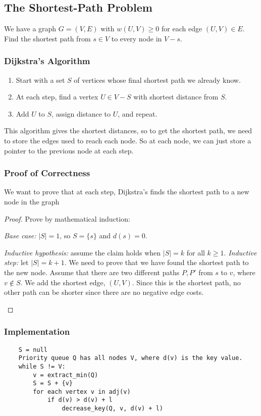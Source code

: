 \documentclass[11pt]{article}
\begin{document}
\subsection{The Shortest-Path Problem}
We have a graph $G = (V,E)$ with $w(U,V) \geq 0$ for each edge $(U,V) \in E$. Find the shortest path from $s \in V$ to every node in $V-s$.
\subsubsection{Dijkstra's Algorithm}
\begin{enumerate}
    \item Start with a set $S$ of vertices whose final shortest path we already know.
    \item At each step, find a vertex $U \in V-S$ with shortest distance from $S$.
    \item Add $U$ to $S$, assign distance to $U$, and repeat.
\end{enumerate}
This algorithm gives the shortest distances, so to get the shortest path, we need to store the edges used to reach each node. So at each node, we can just store a pointer to the previous node at each step.

\subsubsection{Proof of Correctness}
We want to prove that at each step, Dijkstra's finds the shortest path to a new node in the graph
\begin{proof}
Prove by mathematical induction:
\begin{adjustwidth}{2em}{2em}
\textit{Base case:} $|S| = 1$, so $S = \{s\}$ and $d(s) = 0$. \par
\textit{Inductive hypothesis:} assume the claim holds when $|S| = k$ for all $k \geq 1$.
\textit{Inductive step:} let $|S| = k+1$. We need to prove that we have found the shortest path to the new node. Assume that there are two different paths $P, P'$ from $s$ to $v$, where $v \not\in S$. We add the shortest edge, $(U,V)$. Since this is the shortest path, no other path can be shorter since there are no negative edge costs.
\end{adjustwidth}
\end{proof}

\subsubsection{Implementation}
\begin{verbatim}
    S = null
    Priority queue Q has all nodes V, where d(v) is the key value.
    while S != V:
        v = extract_min(Q)
        S = S + {v}
        for each vertex v in adj(v)
            if d(v) > d(v) + l
                decrease_key(Q, v, d(v) + l)
\end{verbatim}
\end{document}
